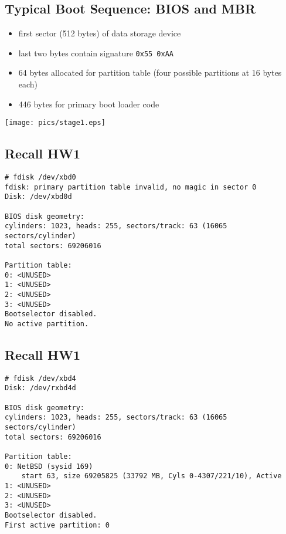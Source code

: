 \documentclass[xga]{xdvislides}
\begin{document}
\subsection{Typical Boot Sequence: BIOS and MBR}
\begin{minipage}[c]{0.7\textwidth}
\begin{itemize}
	\item first sector (512 bytes) of data storage device
	\item last two bytes contain signature \verb+0x55 0xAA+
	\item 64 bytes allocated for partition table (four possible
		partitions at 16 bytes each)
	\item 446 bytes for primary boot loader code
\end{itemize}
\end{minipage}
\begin{minipage}[c]{0.1\textwidth}
\texttt{[image: pics/stage1.eps]} \\
\end{minipage}

\subsection{Recall HW1}
\begin{verbatim}
# fdisk /dev/xbd0
fdisk: primary partition table invalid, no magic in sector 0
Disk: /dev/xbd0d

BIOS disk geometry:
cylinders: 1023, heads: 255, sectors/track: 63 (16065 sectors/cylinder)
total sectors: 69206016

Partition table:
0: <UNUSED>
1: <UNUSED>
2: <UNUSED>
3: <UNUSED>
Bootselector disabled.
No active partition.
\end{verbatim}

\subsection{Recall HW1}
\begin{verbatim}
# fdisk /dev/xbd4
Disk: /dev/rxbd4d

BIOS disk geometry:
cylinders: 1023, heads: 255, sectors/track: 63 (16065 sectors/cylinder)
total sectors: 69206016

Partition table:
0: NetBSD (sysid 169)
    start 63, size 69205825 (33792 MB, Cyls 0-4307/221/10), Active
1: <UNUSED>
2: <UNUSED>
3: <UNUSED>
Bootselector disabled.
First active partition: 0
\end{verbatim}
\end{document}

